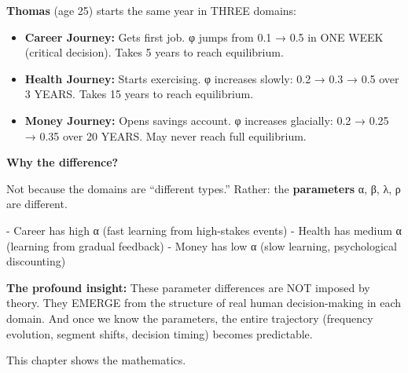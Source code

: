 \begin{tcolorbox}[colback=yellow!5!white, colframe=yellow!75!black, title=Intuition: Why Do Domains Evolve Differently?]

\textbf{Thomas} (age 25) starts the same year in THREE domains:

\begin{itemize}[nosep]
\item \textbf{Career Journey:} Gets first job. φ jumps from 0.1 → 0.5 in ONE WEEK (critical decision). Takes 5 years to reach equilibrium.

\item \textbf{Health Journey:} Starts exercising. φ increases slowly: 0.2 → 0.3 → 0.5 over 3 YEARS. Takes 15 years to reach equilibrium.

\item \textbf{Money Journey:} Opens savings account. φ increases glacially: 0.2 → 0.25 → 0.35 over 20 YEARS. May never reach full equilibrium.
\end{itemize}

\textbf{Why the difference?}

Not because the domains are ``different types.'' Rather: the \textbf{parameters} α, β, λ, ρ are different.

- Career has high α (fast learning from high-stakes events)
- Health has medium α (learning from gradual feedback)
- Money has low α (slow learning, psychological discounting)

\textbf{The profound insight:} These parameter differences are NOT imposed by theory. They EMERGE from the structure of real human decision-making in each domain. And once we know the parameters, the entire trajectory (frequency evolution, segment shifts, decision timing) becomes predictable.

This chapter shows the mathematics.

\end{tcolorbox}


